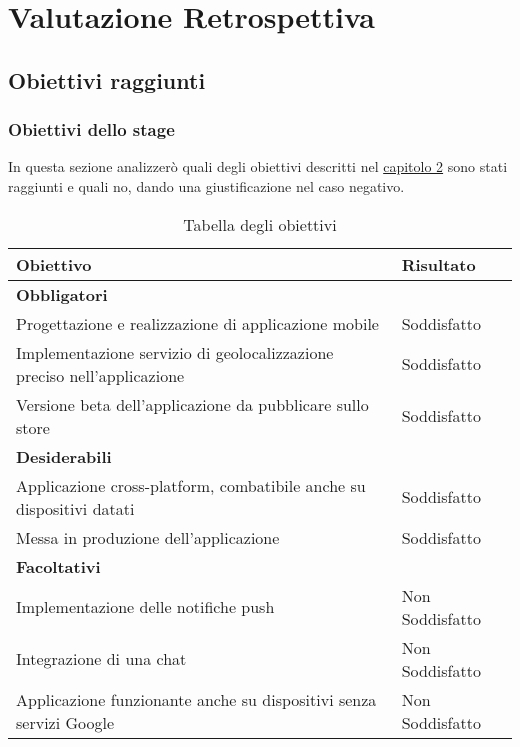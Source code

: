 
\chapter{Valutazione Retrospettiva}
\label{cap:valutazione-retrospettiva}


\section{Obiettivi raggiunti}
\subsection{Obiettivi dello stage}
In questa sezione analizzerò quali degli obiettivi descritti nel \hyperref[sec:obiettivi]{capitolo 2} sono stati raggiunti e quali no, dando
una giustificazione nel caso negativo.

\renewcommand{\arraystretch}{2}
\begin{longtable}{|p{10cm}|p{4cm}|}%
  \caption{Tabella degli obiettivi} 
  \label{tab:obiettivi} \\
    \hline
    \textbf{Obiettivo} & \textbf{Risultato} \\
    \hline
    \endhead
    \multicolumn{2}{|l|}{\textbf{Obbligatori}} \\ \hline
    Progettazione e realizzazione di applicazione mobile                      & Soddisfatto \\ \hline
    Implementazione servizio di geolocalizzazione preciso nell’applicazione   & Soddisfatto \\ \hline
    Versione beta dell'applicazione da pubblicare sullo store                 & Soddisfatto \\ \hline
    \multicolumn{2}{|l|}{\textbf{Desiderabili}} \\ \hline
    Applicazione cross-platform, combatibile anche su dispositivi datati      & Soddisfatto \\ \hline
    Messa in produzione dell’applicazione                                     & Soddisfatto \\ \hline
    \multicolumn{2}{|l|}{\textbf{Facoltativi}} \\ \hline
    Implementazione delle notifiche push                                      & Non Soddisfatto \\ \hline
    Integrazione di una chat                                                  & Non Soddisfatto \\ \hline
    Applicazione funzionante anche su dispositivi senza servizi Google        & Non Soddisfatto \\ \hline
\end{longtable}%

